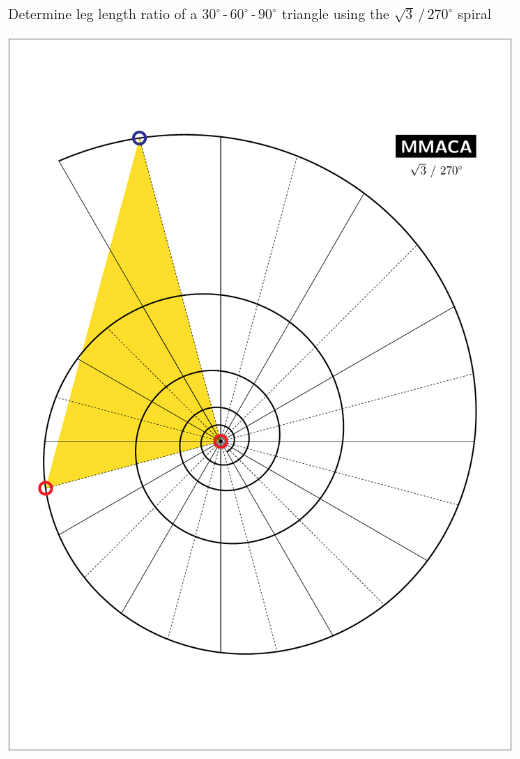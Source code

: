 \documentclass[a4paper,12pt]{article}
\begin{document}
    \begin{center}
    
        \large

        Determine leg length ratio of a $30^{\circ}$\,-\,$60^{\circ}$\,-\,$90^{\circ}$ triangle using the $\sqrt{3} \, / \, 270^{\circ}$ spiral

        \bigskip \bigskip \bigskip
    
        \includegraphics[scale=0.7071]{./pictures/Example_06}

    \end{center}

    \newpage

\end{document}
